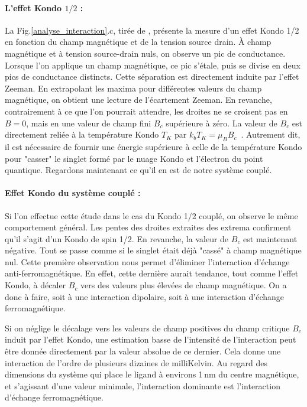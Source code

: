 \paragraph{L'effet Kondo $1/2$ :}
La Fig.\ref{analyse_interaction}.c, tirée de \cite{Roch2009}, présente la mesure d'un effet Kondo 1/2 en fonction du champ magnétique et de la tension source drain. \`A champ magnétique et  à tension source-drain nuls, on observe un pic de conductance. Lorsque l'on applique un champ magnétique, ce pic s'étale, puis se divise en deux pics de conductance distincts. Cette séparation est directement induite par l'effet Zeeman. En extrapolant les maxima pour différentes valeurs du champ magnétique, on obtient une lecture de l'écartement Zeeman. En revanche, contrairement à ce que l'on pourrait attendre, les droites ne se croisent pas en $B=0$, mais en une valeur de champ fini $B_c$ supérieure à zéro. La valeur de $B_c$ est directement reliée à la température Kondo $T_K$ par $k_bT_K = \mu_B B_c$~\cite{Roch2009}. Autrement dit, il est nécessaire de fournir une énergie supérieure à celle de la température Kondo pour "casser" le singlet formé par le nuage Kondo et l'électron du point quantique. Regardons maintenant ce qu'il en est de notre système couplé.

\paragraph{Effet Kondo du système couplé :}
Si l'on effectue cette étude dans le cas du Kondo 1/2 couplé, on observe le même comportement général. Les pentes des droites extraites des extrema confirment qu'il s'agit d'un Kondo de spin 1/2. En revanche, la valeur de $B_c$ est maintenant négative. Tout se passe comme si le singlet était déjà "cassé" à champ magnétique nul. Cette première observation nous permet d'éliminer l'interaction d'échange anti-ferromagnétique. En effet, cette dernière aurait tendance, tout comme l'effet Kondo, à décaler $B_c$ vers des valeurs plus élevées de champ magnétique. On a donc à faire, soit à une interaction dipolaire, soit à une interaction d'échange ferromagnétique.

Si on néglige le décalage vers les valeurs de champ positives du champ critique $B_c$ induit par l'effet Kondo, une estimation basse de l'intensité de l'interaction peut être donnée directement par la valeur absolue de ce dernier. Cela donne une interaction de l'ordre de plusieurs dizaines de milliKelvin. Au regard des dimensions du système qui place le ligand à environs 1\,nm du centre magnétique, et s'agissant d'une valeur minimale, l'interaction dominante est l'interaction d'échange ferromagnétique.

